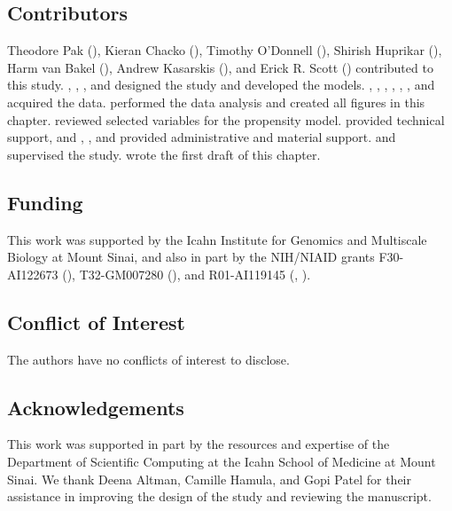 \subsection{Contributors}

Theodore Pak (), Kieran Chacko (), Timothy O'Donnell (), Shirish Huprikar (), Harm van Bakel (), Andrew Kasarskis (), and Erick R. Scott () contributed to this study. , , , and  designed the study and developed the models. , , , , , , and  acquired the data.  performed the data analysis and created all figures in this chapter.  reviewed selected variables for the propensity model.  provided technical support, and , , and  provided administrative and material support.  and  supervised the study.  wrote the first draft of this chapter.

\subsection{Funding}

This work was supported by the Icahn Institute for Genomics and Multiscale Biology at Mount Sinai, and also in part by the NIH/NIAID grants F30-AI122673 (), T32-GM007280 (), and R01-AI119145 (, ).

\subsection{Conflict of Interest}

The authors have no conflicts of interest to disclose.

\subsection{Acknowledgements}

This work was supported in part by the resources and expertise of the Department of Scientific Computing at the Icahn School of Medicine at Mount Sinai. We thank Deena Altman, Camille Hamula, and Gopi Patel for their assistance in improving the design of the study and reviewing the manuscript.